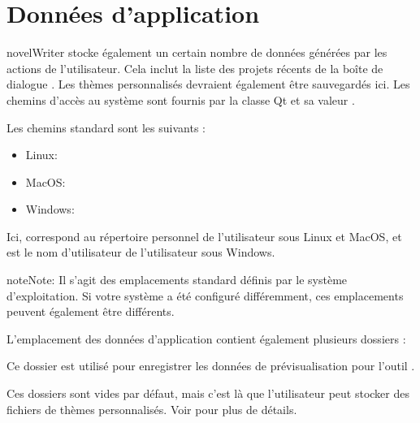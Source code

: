 \documentclass[a4paper,11pt,french]{sphinxmanual}
\begin{document}
\section{Données d’application}
\label{\detokenize{tech_locations:application-data}}\label{\detokenize{tech_locations:a-locations-data}}
\sphinxAtStartPar
novelWriter stocke également un certain nombre de données générées par les actions de l’utilisateur. Cela inclut la liste des projets récents de la boîte de dialogue . Les thèmes personnalisés devraient également être sauvegardés ici. Les chemins d’accès au système sont fournis par la classe Qt  et sa valeur .

\sphinxAtStartPar
Les chemins standard sont les suivants :
\begin{itemize}
\item {} 
\sphinxAtStartPar
Linux: 

\item {} 
\sphinxAtStartPar
MacOS: 

\item {} 
\sphinxAtStartPar
Windows: 

\end{itemize}

\sphinxAtStartPar
Ici, \sphinxcode{\sphinxupquote{\textasciitilde{}}} correspond au répertoire personnel de l’utilisateur sous Linux et MacOS, et  est le nom d’utilisateur de l’utilisateur sous Windows.

\begin{sphinxadmonition}{note}{Note:}
\sphinxAtStartPar
Il s’agit des emplacements standard définis par le système d’exploitation. Si votre système a été configuré différemment, ces emplacements peuvent également être différents.
\end{sphinxadmonition}

\sphinxAtStartPar
L’emplacement des données d’application contient également plusieurs dossiers :
\begin{description}
\sphinxAtStartPar
Ce dossier est utilisé pour enregistrer les données de prévisualisation pour l’outil .

\sphinxAtStartPar
Ces dossiers sont vides par défaut, mais c’est là que l’utilisateur peut stocker des fichiers de thèmes personnalisés. Voir {\hyperref[\detokenize{more_customise:a-custom}]{}} pour plus de détails.

\end{description}
\end{document}
